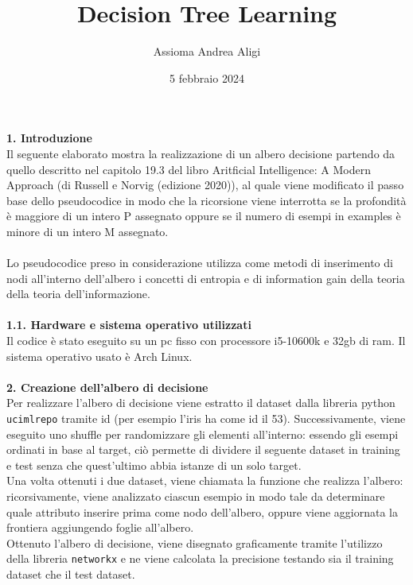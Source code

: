\documentclass{article}
\begin{document}
\title{\textbf{Decision Tree Learning}}
\author{Assioma Andrea Aligi}
\date{5 febbraio 2024}
\maketitle


{\Large \textbf{1. Introduzione}}\\
Il seguente elaborato mostra la realizzazione di un albero decisione partendo da quello descritto nel capitolo 19.3 del libro Aritficial Intelligence: A Modern Approach  
(di Russell e Norvig (edizione 2020)), al quale viene modificato il passo base dello pseudocodice in modo che la ricorsione viene interrotta se la profondità è maggiore 
di un intero P assegnato oppure se il numero di esempi in examples è minore di un intero M assegnato.\\
\\
Lo pseudocodice preso in considerazione utilizza come metodi di inserimento di nodi all'interno dell'albero i concetti di entropia e di information gain della teoria della teoria
dell'informazione.\\
\\
{\Large \textbf{{\large{1}}.{\small{1}}. Hardware e sistema operativo utilizzati}}\\
Il codice è stato eseguito su un pc fisso con processore i5-10600k e 32gb di ram. Il sistema operativo usato è Arch Linux.\\
\\
{\Large \textbf{2. Creazione dell'albero di decisione}}\\
Per realizzare l'albero di decisione viene estratto il dataset dalla libreria python \texttt{ucimlrepo} tramite id (per esempio l'iris ha come id il 53). Successivamente, viene eseguito uno
shuffle per randomizzare gli elementi all'interno: essendo gli esempi ordinati in base al target, ciò permette di dividere il seguente dataset in training e test 
senza che quest'ultimo abbia istanze di un solo target.\\
Una volta ottenuti i due dataset, viene chiamata la funzione che realizza l'albero: ricorsivamente, viene analizzato ciascun esempio in modo tale da determinare quale attributo
inserire prima come nodo dell'albero, oppure viene aggiornata la frontiera aggiungendo foglie all'albero.\\
Ottenuto l'albero di decisione, viene disegnato graficamente tramite l'utilizzo della libreria \texttt{networkx} e ne viene calcolata la precisione testando sia il training dataset
che il test dataset.\\
\end{document}
